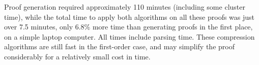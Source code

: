 Proof generation required approximately 110 minutes (including some cluster time), while the total time to apply both algorithms on all these proofs was just over 7.5 minutes, only 6.8\% more time than generating proofs in the first place, on a simple laptop computer. All times include parsing time.  These compression algorithms are still fast in the first-order case, and may simplify the proof considerably for a relatively small cost in time.









